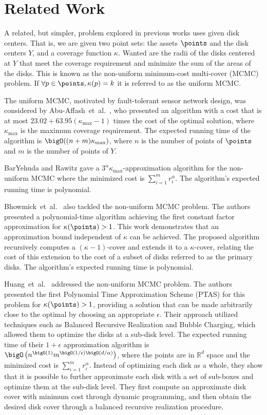 \section{Related Work}
\label{sec:RelatedWork}

A related, but simpler, problem explored in previous works uses given disk centers.
That is, we are given two point sets: the assets $\points$ and the disk centers
$Y$, and a coverage function $\kappa$. Wanted are the radii of the disks
centered at $Y$ that meet the coverage requirement and minimize the sum of the
areas of the disks.  This is known as the non-uniform minimum-cost multi-cover
(MCMC) problem.
If $ \forall p \in \points, \kappa(p)=k $ it is referred to as the uniform MCMC.

The uniform MCMC, motivated by fault-tolerant sensor network design, was considered by Abu-Affash~et~al.~\cite{abu2011multi}, who presented an algorithm with a cost that is at most $23.02 + 63.95(\kappa_{\text{max}} - 1)$ times the cost of the optimal solution, where
$\kappa_{\text{max}}$ is the maximum coverage requirement.
The expected running time of the algorithm is $\bigO((n + m)\kappa_{\text{max}})$, where $n$ is the number of points of $\points$ and $m$  is the number of points of $Y$.

BarYehuda and Rawitz \cite{bar2013note} gave a $3^\alpha \kappa_{\text{max}}$-approximation algorithm for the non-uniform MCMC where the minimized cost is $\sum_{i=1}^{m} r_i^{\alpha}$.
The algorithm's expected running time   is polynomial.

Bhowmick~et~al.~\cite{bhowmick2013constant} also tackled the non-uniform MCMC problem.
The authors presented a polynomial-time algorithm achieving the first constant factor approximation for $\kappa(\points)>1$.
This work demonstrates that an approximation bound independent of $\kappa$ can be achieved.
The proposed algorithm recursively computes a $(\kappa - 1)$-cover and extends it to a $\kappa$-cover, relating the cost of this extension to the cost of a subset of disks referred to as the primary disks.
The algorithm's expected running time is polynomial.

Huang~et~al.~\cite{huang2021ptas,huang2024ptas} addressed the non-uniform MCMC problem.
The authors presented the first Polynomial Time Approximation Scheme (PTAS) for this problem for $\kappa(\points)>1$, providing a solution that can be made arbitrarily close to the optimal by choosing an appropriate $\epsilon$.
Their approach utilized techniques such as Balanced Recursive Realization and Bubble Charging, which allowed them to optimize the disks at a sub-disk level.
The expected running time of their $1+\epsilon$ approximation algorithm is $\bigO\left(n^{\bigO(1)} m^{\bigO(1/\epsilon) \bigO(d/\alpha)}\right)$, where the points are in $\mathbb{R}^d$ space and the minimized cost is $\sum_{i=1}^{m} r_i^{\alpha}$.
Instead of optimizing each disk as a whole, they show that it is possible to further approximate each disk with a set of sub-boxes and optimize them at the sub-disk level.
They first compute an approximate disk cover with minimum cost through dynamic programming, and then obtain the desired disk cover through a balanced recursive realization procedure.

